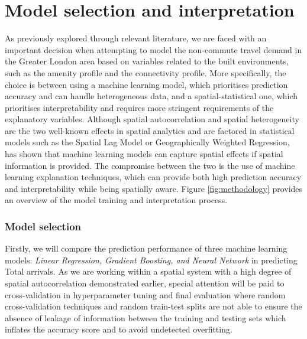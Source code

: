 \section{Model selection and interpretation}

As previously explored through relevant literature, we are faced with an important decision when attempting to model the non-commute travel demand in the Greater London area based on variables related to the built environments, such as the amenity profile and the connectivity profile. More specifically, the choice is between using a machine learning model, which prioritises prediction accuracy and can handle heterogeneous data, and a spatial-statistical one, which prioritises interpretability and requires more stringent requirements of the explanatory variables. Although spatial autocorrelation and spatial heterogeneity are the two well-known effects in spatial analytics and are factored in statistical models such as the Spatial Lag Model or Geographically Weighted Regression, \citet{liExtractingSpatialEffects2022} has shown that machine learning models can capture spatial effects if spatial information is provided. The compromise between the two is the use of machine learning explanation techniques, which can provide both high prediction accuracy and interpretability while being spatially aware. Figure \ref{fig:methodology} provides an overview of the model training and interpretation process.

\subsubsection*{Model selection}
Firstly, we will compare the prediction performance of three machine learning models: \textit{Linear Regression, Gradient Boosting, and Neural Network} in predicting Total arrivals. As we are working within a spatial system with a high degree of spatial autocorrelation demonstrated earlier, special attention will be paid to cross-validation in hyperparameter tuning and final evaluation where random cross-validation techniques and random train-test splits are not able to ensure the absence of leakage of information between the training and testing sets which inflates the accuracy score and to avoid undetected overfitting. 

